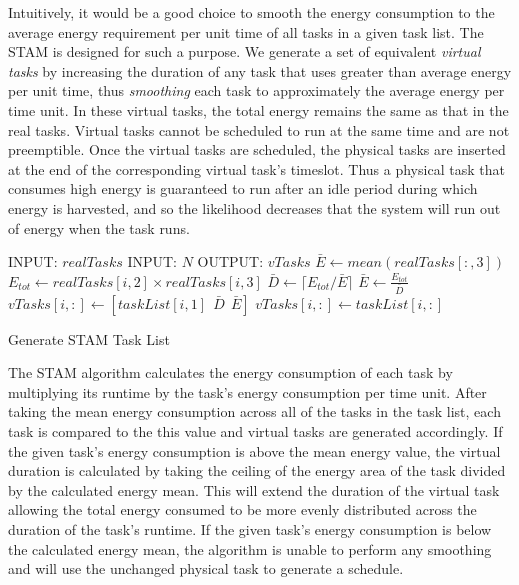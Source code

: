 Intuitively, it would be a good choice to smooth the energy consumption to the average energy requirement per unit time of all tasks in a given task list. The \textsc{STAM} is designed for such a purpose. We generate a set of equivalent \emph{virtual tasks} by increasing the duration of any task that uses greater than average energy per unit time, thus \emph{smoothing} each task to approximately the average energy per time unit. In these virtual tasks, the total energy remains the same as that in the real tasks.  Virtual tasks cannot be scheduled to run at the same time and are not preemptible.  Once the virtual tasks are scheduled, the physical tasks are inserted at the end of the corresponding virtual task's timeslot.  Thus a physical task that consumes high energy is guaranteed to run after an idle period during which energy is harvested, and so the likelihood decreases that the system will run out of energy when the task runs. 

\begin{algorithm}[htb]
\label{stamalg}
\begin{algorithmic}
\STATE INPUT: $realTasks$  
\STATE INPUT: $N$ 
\STATE OUTPUT: $vTasks$ 
\STATE $\bar{E} \gets mean(realTasks[:,3])$
\STATE $E_{tot} \gets realTasks[i, 2] \times realTasks[i,3]$
\STATE $\bar{D} \gets \lceil E_{tot} / \bar{E} \rceil$
\STATE $\bar{E} \gets \frac{E_{tot}}{\bar{D}}$
\STATE $vTasks[i,:] \gets [taskList[i,1]~~\bar{D}~~\bar{E}]$
\ELSE
\STATE $vTasks[i,:] \gets taskList[i,:]$
\ENDIF
\ENDFOR
\end{algorithmic}
\caption{Generate \textsc{STAM} Task List}
\end{algorithm}

The \textsc{STAM} algorithm calculates the energy consumption of each task by multiplying its runtime by the task's energy consumption per time unit. After taking the mean energy consumption across all of the tasks in the task list, each task is compared to the this value and virtual tasks are generated accordingly. If the given task's energy consumption is above the mean energy value, the virtual duration is calculated by taking the ceiling of the energy area of the task divided by the calculated energy mean. This will extend the duration of the virtual task allowing the total energy consumed to be more evenly distributed across the duration of the task's runtime. If the given task's energy consumption is below the calculated energy mean, the algorithm is unable to perform any smoothing and  will use the unchanged physical task to generate a schedule.

